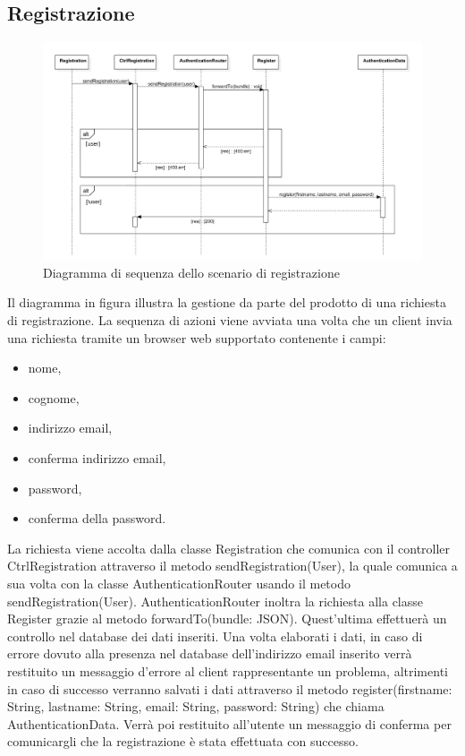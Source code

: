 \documentclass[a4paper, titlepage]{article}
\begin{document}
\newpage
\subsection{Registrazione}
\begin{figure}[!h]
	\centering
	\includegraphics[scale=0.5]{Img/seq-register.pdf}
	\caption{Diagramma di sequenza dello scenario di registrazione}
\end{figure}
Il diagramma in figura illustra la gestione da parte del prodotto di una richiesta di registrazione. La sequenza di azioni viene avviata una volta che un client invia una richiesta tramite un browser web supportato contenente i campi: 
\begin{itemize}
	\item nome,
	\item cognome,
	\item indirizzo email,
	\item conferma indirizzo email,
	\item password,
	\item conferma della password.
\end{itemize}
La richiesta viene accolta dalla classe Registration che comunica con il controller CtrlRegistration attraverso il metodo sendRegistration(User), la quale comunica a sua volta con la classe AuthenticationRouter usando il metodo sendRegistration(User).
AuthenticationRouter inoltra la richiesta alla classe Register grazie al metodo forwardTo(bundle: JSON). Quest'ultima effettuerà un controllo nel database dei dati inseriti. Una volta elaborati i dati, in caso di errore dovuto alla presenza nel database dell'indirizzo email inserito verrà restituito un messaggio d'errore al client rappresentante un problema, altrimenti in caso di successo verranno salvati i dati attraverso il metodo register(firstname: String, lastname: String, email: String, password: String) che chiama AuthenticationData. Verrà poi restituito all'utente un messaggio di conferma per comunicargli che la registrazione è stata effettuata con successo.
\end{document}
